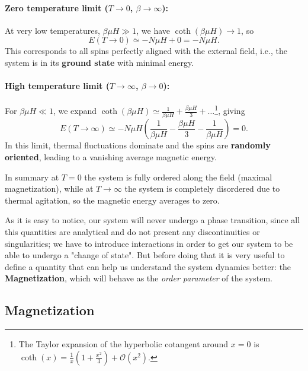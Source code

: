 \paragraph{Zero temperature limit ($T \to 0$, $\beta \to \infty$):}
At very low temperatures, $\beta \mu H \gg 1$, we have $\coth(\beta \mu H) \to 1$, so
\[
    E(T \to 0) \simeq -N\mu H + 0 = -N \mu H.
\]
This corresponds to all spins perfectly aligned with the external field, i.e., the system is in its \textbf{ground state} with minimal energy.

\paragraph{High temperature limit ($T \to \infty$, $\beta \to 0$):}
For $\beta \mu H \ll 1$, we expand $\coth(\beta \mu H) \simeq \frac{1}{\beta \mu H} + \frac{\beta \mu H}{3} + \dots$\footnote{The Taylor expansion of the hyperbolic cotangent around $x=0$ is \(\coth(x) = \frac{1}{x} \left(1 + \frac{x^2}{3} \right) + \mathcal{O}(x^2)\).}, giving
\[
    E(T \to \infty) \simeq - N \mu H \left( \frac{1}{\beta \mu H} - \frac{\beta \mu H}{3} - \frac{1}{\beta \mu H} \right) = 0.
\]
In this limit, thermal fluctuations dominate and the spins are \textbf{randomly oriented}, leading to a vanishing average magnetic energy.

In summary at $T=0$ the system is fully ordered along the field (maximal magnetization), while at $T\to \infty$ the system is completely disordered due to thermal agitation, so the magnetic energy averages to zero.

As it is easy to notice, our system will never undergo a phase transition, since all this quantities are analytical and do not present any discontinuities or singularities; we have to introduce interactions in order to get our system to be able to undergo a "change of state". But before doing that it is very useful to define a quantity that can help us understand the system dynamics better: the \textbf{Magnetization}, which will behave as the \textit{order parameter} of the system.

\subsection{Magnetization}

